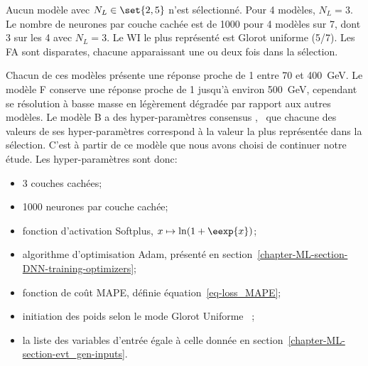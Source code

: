\par
Aucun modèle avec $N_L\in\set{2,5}$ n'est sélectionné.
Pour 4 modèles, $N_L=3$.
Le nombre de neurones par couche cachée est de \num{1000} pour 4 modèles sur 7, dont 3 sur les 4 avec $N_L=3$.
Le WI le plus représenté est Glorot uniforme (5/7).
Les FA sont disparates, chacune apparaissant une ou deux fois dans la sélection.
\par
Chacun de ces modèles présente une réponse proche de 1 entre \num{70} et \SI{400}{\GeV}.
Le modèle F conserve une réponse proche de 1 jusqu'à environ \SI{500}{\GeV}, cependant se résolution à basse masse en légèrement dégradée par rapport aux autres modèles.
Le modèle B a des hyper-paramètres \og consensus \fg,
\ie\ que chacune des valeurs de ses hyper-paramètres correspond à la valeur la plus représentée dans la sélection.
C'est à partir de ce modèle que nous avons choisi de continuer notre étude.
Les hyper-paramètres sont donc:
\begin{itemize}
\item 3 couches cachées;
\item \num{1000} neurones par couche cachée;
\item fonction d'activation Softplus, $x\mapsto\ln(1+\eexp{x})$;
\item algorithme d'optimisation Adam, présenté en section~\ref{chapter-ML-section-DNN-training-optimizers};
\item fonction de coût MAPE, définie équation~\eqref{eq-loss_MAPE};
\item initiation des poids selon le mode \og Glorot Uniforme \fg~\cite{glorot};
\item la liste des variables d'entrée égale à celle donnée en section~\ref{chapter-ML-section-evt_gen-inputs}.
\end{itemize}


